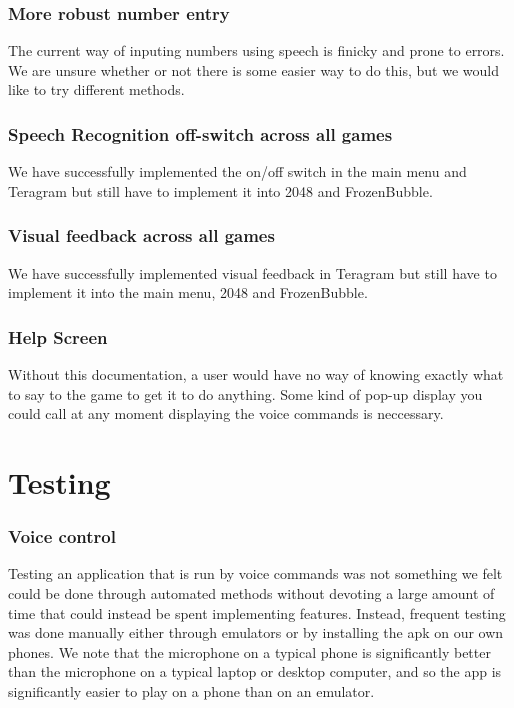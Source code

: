 \documentclass[11pt, oneside]{article}
\begin{document}
\subsubsection*{More robust number entry}
The current way of inputing numbers using speech is finicky and prone to
errors. We are unsure whether or not there is some easier way to do this,
but we would like to try different methods.

\subsubsection*{Speech Recognition off-switch across all games}
We have successfully implemented the on/off switch in the main menu and 
Teragram but still have to implement it into 2048 and FrozenBubble.

\subsubsection*{Visual feedback across all games}
We have successfully implemented visual feedback in Teragram but still 
have to implement it into the main menu, 2048 and FrozenBubble.

\subsubsection*{Help Screen}
Without this documentation, a user would have no way of knowing exactly 
what to say to the game to get it to do anything. Some kind of pop-up 
display you could call at any moment displaying the voice commands is
neccessary. 

\section{Testing}

\subsubsection*{Voice control}

Testing an application that is run by voice commands was not something
we felt could be done through automated methods without devoting a
large amount of time that could instead be spent implementing
features.  Instead, frequent testing was done manually either through
emulators or by installing the apk on our own phones. We note that the
microphone on a typical phone is significantly better than the
microphone on a typical laptop or desktop computer, and so the app is
significantly easier to play on a phone than on an emulator.
\end{document}
